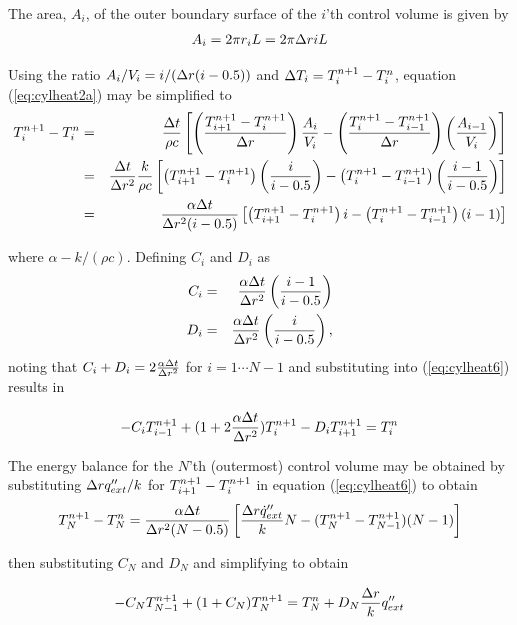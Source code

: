 \noindent The area, $A_i$, of the outer boundary surface of the $i$'th
control volume is given by
\begin{eqnarray*}
A_i=2\pi r_iL
=2\pi \Delta r iL
\label{eq:cylheat4}
\end{eqnarray*}

\noindent Using the ratio $A_i/V_i=i/(\Delta r(i-0.5))$
and $\Delta T_i=T_{i}^{n+1}-T_i^n$,
equation (\ref{eq:cylheat2a}) may be simplified to
\begin{eqnarray}
T_{i}^{n+1}-T_i^n&=&\frac{\Delta t}{\rho c}
\left[
\left(\frac{T_{i+1}^{n+1}-T_{i}^{n+1}}{\Delta r}\right)
\frac{A_i}{V_i}-
\left(\frac{T_{i}^{n+1}-T_{i-1}^{n+1}}{\Delta r}\right)
\left(\frac{A_{i-1}}{V_i}\right)
\right]
\nonumber\\
&=&\frac{\Delta t}{\Delta r^2}\frac{k}{\rho c}
\left[
\left(T_{i+1}^{n+1}-T_{i}^{n+1}\right)
\left(\frac{i}{i-0.5}\right)-
\left(T_{i}^{n+1}-T_{i-1}^{n+1}\right)
\left(\frac{i-1}{i-0.5}\right)
\right]\nonumber\\
&=&\frac{\alpha\Delta t}{\Delta r^2(i-0.5)}
\left[
\left(T_{i+1}^{n+1}-T_{i}^{n+1}\right)
i-
\left(T_{i}^{n+1}-T_{i-1}^{n+1}\right)
(i-1)
\right]
\label{eq:cylheat6}
\end{eqnarray}

\noindent where $\alpha-k/(\rho c)$.  Defining $C_i$ and $D_i$ as
\begin{eqnarray*}
C_i&=&\frac{\alpha\Delta t}{\Delta r^2}\left(\frac{i-1}{i-0.5}\right)\\
D_i&=&\frac{\alpha\Delta t}{\Delta r^2}\left(\frac{i}{i-0.5}\right),\\
\end{eqnarray*}
\noindent noting that $C_i+D_i=2\frac{\alpha\Delta t}{\Delta r^2}$
for $i=1\cdots N-1$ and
substituting into (\ref{eq:cylheat6}) results in

\begin{equation}
-C_iT_{i-1}^{n+1}+(1+2\frac{\alpha\Delta t}{\Delta r^2})T_{i}^{n+1}-D_iT_{i+1}^{n+1}=T_i^n
\label{eq:cylheat8}
\end{equation}

\noindent The energy balance for the $N$'th (outermost) control volume may be obtained by substituting $\Delta r q''_{ext}/k$ for $T_{i+1}^{n+1}-T_{i}^{n+1}$ in equation (\ref{eq:cylheat6}) to obtain
\begin{eqnarray*}
T_N^{n+1}-T_N^n=\frac{\alpha\Delta t}{\Delta r^2(N-0.5)}
\left[\frac{\Delta r\dot{q}''_{ext}}{k}N-(T_N^{n+1}-T_{N-1}^{n+1})(N-1)\right]
\end{eqnarray*}

\noindent then substituting $C_N$ and $D_N$ and simplifying
to obtain

\begin{equation}
-C_NT_{N-1}^{n+1}+(1+C_N)T_N^{n+1}=T_N^n+D_N\frac{\Delta r}{k}q''_{ext}
\label{eq:cylheat10}
\end{equation}


